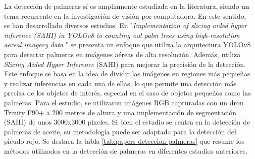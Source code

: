 La detección de palmeras sí es ampliamente estudiada en la literatura, siendo un tema recurrente en la investigación de visión por computadora. En este sentido, se han desarrollado diversos estudios. En "\textit{Implementation of slicing aided hyper inference (SAHI) in YOLOv8 to counting oul palm trees using high-resolution aereal imagery data} \citep{zhorif_implementation_2024}" se presenta un enfoque que utiliza la arquitectura YOLOv8 para detectar palmeras en imágenes aéreas de alta resolución. Además, utiliza \textit{Slicing Aided Hyper Inference} (SAHI) para mejorar la precisión de la detección. Este enfoque se basa en la idea de dividir las imágenes en regiones más pequeñas y realizar inferencias en cada una de ellas, lo que permite una detección más precisa de los objetos de interés, especial en el caso de objetos pequeños como las palmeras. Para el estudio, se utilizaron imágenes RGB capturadas con un dron Trinity F90+ a 200 metros de altura y una implementación de segmentación (SAHI) de unos 3000x3000 píxeles. Si bien el estudio se centra en la detección de palmeras de aceite, su metodología puede ser adaptada para la detección del picudo rojo. Se destaca la tabla \ref{tab:papers-deteccion-palmeras} que resume los métodos utilizados en la detección de palmeras en diferentes estudios anteriores.


